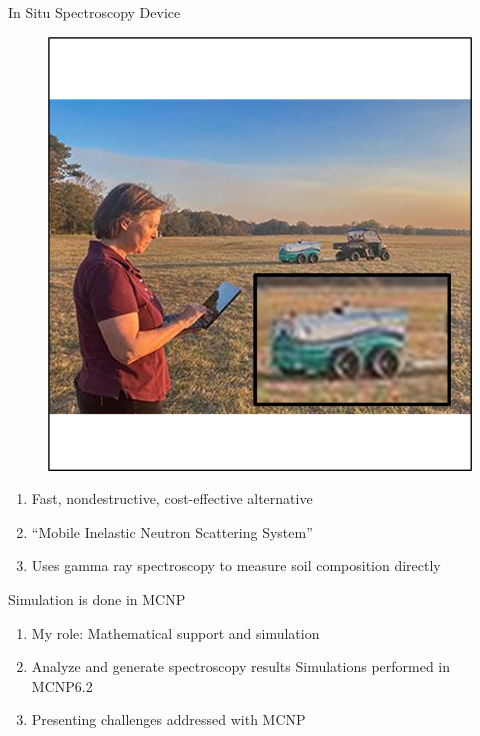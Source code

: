 \documentclass[10pt,hyperref={colorlinks,citecolor=blue,urlcolor=peking_blue,linkcolor=}]{beamer}
\theoremstyle{plain}
\begin{document}
\begin{frame}{In Situ Spectroscopy Device}
\begin{figure}[MINS on Field]
\begin{center}
\includegraphics[width=1\linewidth]{../Figures/Misc/MINSInField.png}
\end{center}
\end{figure}
\begin{enumerate}
\item Fast, nondestructive, cost-effective alternative
\item “Mobile Inelastic Neutron Scattering System”
\item Uses gamma ray spectroscopy to measure soil composition directly
\end{enumerate}
\end{frame}
\begin{frame}{Simulation is done in MCNP}
\begin{enumerate}
\item My role: Mathematical support and simulation
\item Analyze and generate spectroscopy results
Simulations performed in MCNP6.2
\item Presenting challenges addressed with MCNP
\end{enumerate}
\end{frame}
\end{document}
